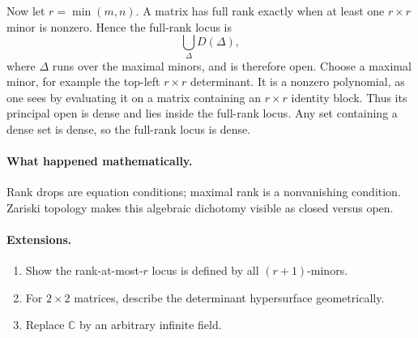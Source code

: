 Now let \(r=\min(m,n)\).  A matrix has full rank exactly when at least one \(r\times r\)
minor is nonzero.  Hence the full-rank locus is
\[
\bigcup_{\Delta}D(\Delta),
\]
where \(\Delta\) runs over the maximal minors, and is therefore open.  Choose a maximal
minor, for example the top-left \(r\times r\) determinant.  It is a nonzero polynomial, as
one sees by evaluating it on a matrix containing an \(r\times r\) identity block.  Thus its
principal open is dense and lies inside the full-rank locus.  Any set containing a dense set
is dense, so the full-rank locus is dense.

\paragraph{What happened mathematically.}
Rank drops are equation conditions; maximal rank is a nonvanishing condition.  Zariski
topology makes this algebraic dichotomy visible as closed versus open.

\paragraph{Extensions.}
\begin{enumerate}
\item Show the rank-at-most-\(r\) locus is defined by all \((r+1)\)-minors.
\item For \(2\times2\) matrices, describe the determinant hypersurface geometrically.
\item Replace \(\mathbb C\) by an arbitrary infinite field.
\end{enumerate}
\fi
